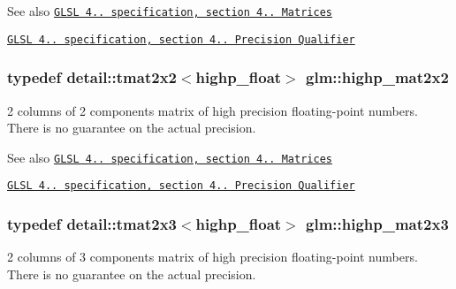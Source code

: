 \begin{DoxySeeAlso}{\-See also}
\href{http://www.opengl.org/registry/doc/GLSLangSpec.4.20.8.pdf}{\tt \-G\-L\-S\-L 4.. specification, section 4.. \-Matrices} 

\href{http://www.opengl.org/registry/doc/GLSLangSpec.4.20.8.pdf}{\tt \-G\-L\-S\-L 4.. specification, section 4.. \-Precision \-Qualifier} 
\end{DoxySeeAlso}
\hypertarget{group__core__precision_gadc6208de252d8c5d4afd1a3518370db3}{
\subsubsection[{highp\-\_\-mat2x2}]{\setlength{\rightskip}{0pt plus 5cm}typedef detail\-::tmat2x2$<$highp\-\_\-float$>$ {\bf glm\-::highp\-\_\-mat2x2}}}\label{group__core__precision_gadc6208de252d8c5d4afd1a3518370db3}
2 columns of 2 components matrix of high precision floating-\/point numbers. \-There is no guarantee on the actual precision.

\begin{DoxySeeAlso}{\-See also}
\href{http://www.opengl.org/registry/doc/GLSLangSpec.4.20.8.pdf}{\tt \-G\-L\-S\-L 4.. specification, section 4.. \-Matrices} 

\href{http://www.opengl.org/registry/doc/GLSLangSpec.4.20.8.pdf}{\tt \-G\-L\-S\-L 4.. specification, section 4.. \-Precision \-Qualifier} 
\end{DoxySeeAlso}
\hypertarget{group__core__precision_ga89136b699656886b0941c95cf2778da3}{
\subsubsection[{highp\-\_\-mat2x3}]{\setlength{\rightskip}{0pt plus 5cm}typedef detail\-::tmat2x3$<$highp\-\_\-float$>$ {\bf glm\-::highp\-\_\-mat2x3}}}\label{group__core__precision_ga89136b699656886b0941c95cf2778da3}
2 columns of 3 components matrix of high precision floating-\/point numbers. \-There is no guarantee on the actual precision.

